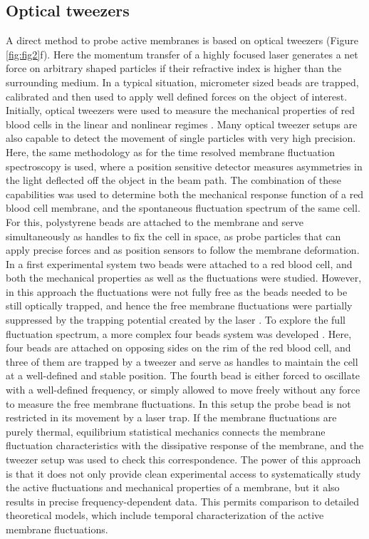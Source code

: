 \documentclass[graybox]{svmult}
\begin{document}
	\subsection{Optical tweezers}
A direct method to probe active membranes is based on optical tweezers (Figure \ref{fig:fig2}f). Here the momentum transfer of a highly focused laser generates a net force on arbitrary shaped particles if their refractive index is higher than the surrounding medium. In a typical situation, micrometer sized beads are trapped, calibrated and then used to apply well defined forces on the object of interest. Initially, optical tweezers were used to measure the mechanical properties of red blood cells in the linear and nonlinear regimes \cite{Henon:1999, Mills:2004}. Many optical tweezer setups are also capable to detect the movement of single particles with very high precision. Here, the same methodology as for the time resolved membrane fluctuation spectroscopy is used, where a position sensitive detector measures asymmetries in the light deflected off the object in the beam path. The combination of these capabilities was used to determine both the mechanical response function of a red blood cell membrane, and the spontaneous fluctuation spectrum of the same cell. For this, polystyrene beads are attached to the membrane and serve simultaneously as handles to fix the cell in space, as probe particles that can apply precise forces and as position sensors to follow the membrane deformation. In a first experimental system two beads were attached to a red blood cell, and both the mechanical properties as well as the fluctuations were studied. However, in this approach the fluctuations were not fully free as the beads needed to be still optically trapped, and hence the free membrane fluctuations were partially suppressed by the trapping potential created by the laser \cite{Yoon:2011}. To explore the full fluctuation spectrum, a more complex four beads system was developed \cite{Turlier:2016}. Here, four beads are attached on opposing sides on the rim of the red blood cell, and three of them are trapped by a tweezer and serve as handles to maintain the cell at a well-defined and stable position. The fourth bead is either forced to oscillate with a well-defined frequency, or simply allowed to move freely without any force to measure the free membrane fluctuations. In this setup the probe bead is not restricted in its movement by a laser trap. If the membrane fluctuations are purely thermal, equilibrium statistical mechanics connects the membrane fluctuation characteristics with the dissipative response of the membrane, and the tweezer setup was used to check this correspondence. The power of this approach is that it does not only provide clean experimental access to systematically study the active fluctuations and mechanical properties of a membrane, but it also results in precise frequency-dependent data. This permits comparison to detailed theoretical models, which include temporal characterization of the active membrane fluctuations. 
\end{document}
